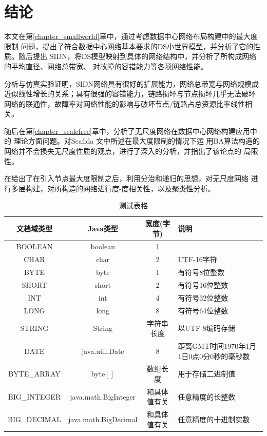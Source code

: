 \documentclass[phd,nobackinfo]{scutthesis}
\begin{document}
\chapter{结论}\label{chapter_concludes}

本文在第\ref{chapter_smallworld}章中，通过考虑数据中心网络布局构建中的最大度限制
问题，提出了符合数据中心网络基本要求的DS小世界模型，并分析了它的性质。随后提出
SIDN，将DS模型映射到具体的网络结构中，并分析了所构成网络的平均直径、网络总带宽、
对故障的容错能力等各项网络性能。

分析与仿真实验证明，SIDN网络具有很好的扩展能力，网络总带宽与网络规模成
近似线性增长的关系；具有很强的容错能力，链路损坏与节点损坏几乎无法破坏
网络的联通性，故障率对网络性能的影响与破坏节点/链路占总资源比率线性相关。

随后在第\ref{chapter_scalefree}章中，分析了无尺度网络在数据中心网络构建应用中的
理论方面问题。对Scafida \cite{gyarmati2010scafida}文中所述在最大度限制的情况下运
用BA算法构造的网络并不会损失无尺度性质的观点，进行了深入的分析，并指出了该论点的
局限性。

在给出了在引入节点最大度限制之后，利用分治和递归的思想，对无尺度网络
进行多层构建，对所构造的网络进行度-度相关性，以及聚类性分析。

\begin{table}
  \centering
  \begin{tabular}{cccp{38mm}}
    \toprule
    \textbf{文档域类型} & \textbf{Java类型} & \textbf{宽度(字节)} & \textbf{说明} \\
    \midrule
    BOOLEAN  & boolean &  1  & \\
    CHAR     & char    &  2  & UTF-16字符 \\
    BYTE     & byte    &  1  & 有符号8位整数 \\
    SHORT    & short   &  2  & 有符号16位整数 \\
    INT      & int     &  4  & 有符号32位整数 \\
    LONG     & long    &  8  & 有符号64位整数 \\
    STRING   & String  &  字符串长度  & 以UTF-8编码存储 \\
    DATE     & java.util.Date & 8 & 距离GMT时间1970年1月1日0点0分0秒的毫秒数 \\
    BYTE\_ARRAY & byte$[]$ & 数组长度 & 用于存储二进制值 \\
    BIG\_INTEGER & java.math.BigInteger & 和具体值有关 & 任意精度的长整数 \\
    BIG\_DECIMAL & java.math.BigDecimal & 和具体值有关 & 任意精度的十进制实数 \\
    \bottomrule
  \end{tabular}
  \caption{测试表格}\label{table:test5}
\end{table}
\end{document}
